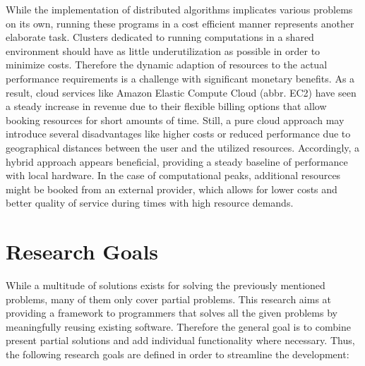 While the implementation of distributed algorithms implicates various problems on its own, running these programs in a cost efficient manner represents another elaborate task. Clusters dedicated to running computations in a shared environment should have as little underutilization as possible in order to minimize costs. Therefore the dynamic adaption of resources to the actual performance requirements is a challenge with significant monetary benefits. As a result, cloud services like Amazon Elastic Compute Cloud (abbr. EC2) have seen a steady increase in revenue due to their flexible billing options that allow booking resources for short amounts of time\cite{gartner_2017}. Still, a pure cloud approach may introduce several disadvantages like higher costs or reduced performance due to geographical distances between the user and the utilized resources. Accordingly, a hybrid approach appears beneficial, providing a steady baseline of performance with local hardware. In the case of computational peaks, additional resources might be booked from an external provider, which allows for lower costs and better quality of service during times with high resource demands.

\section*{Research Goals}
\label{goals}
While a multitude of solutions exists for solving the previously mentioned problems, many of them only cover partial problems. This research aims at providing a framework to programmers that solves all the given problems by meaningfully reusing existing software. Therefore the general goal is to combine present partial solutions and add individual functionality where necessary. Thus, the following research goals are defined in order to streamline the development:

